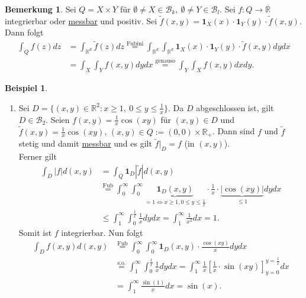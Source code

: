\documentclass[a4paper]{scrreprt}
\newcommand{\doubleOne}{\textbf{1}}
\newcommand{\R}{\mathbb{R}}
\newcommand{\Rq}{\overline{\R}}
\newcommand{\Borel}{\mathcal{B}}
\newcommand{\jlabel}[1]{\label{j_#1}}
\newcommand{\jshortlink}[1]{\jhyperref{#1}{\text{#1}}}
\newcommand{\jhyperref}[2]{\hyperref[j_#1]{#2}}
\newcommand{\jlink}[1]{\jhyperref{#1}{#1}}
\newcommand{\jabb}[3]{ #1: #2 \rightarrow #3 }
\newcommand{\jshortlinkFubini}{\jhyperref{Fubini}{\text{Fub}}}
\theoremstyle{plain}
\theoremstyle{definition}
\newtheorem{bem}[thm]{Bemerkung}
\newtheorem*{expl*}{Beispiel}
\begin{document}
{{{{\begin{bem}
\jlabel{Bem 3.29}
    Sei $Q=X\times Y$ für $\emptyset \ne X \in \Borel_k, \ \emptyset \ne Y \in \Borel_l$. Sei $\jabb{f}{Q}{\Rq}$ integrierbar oder \jlink{messbar} und positiv. Sei $\tilde{f}(x,y) = \doubleOne_X(x)\cdot \doubleOne_Y(y)\cdot \tilde{f}(x,y)$. Dann folgt
    \begin{displaymath}
        \begin{split}
            \int_Q f(z)dz &= \int_{\R^d} \tilde{f}(z)dz \overset{\jshortlink{Fubini}}{=} \int_{\R^d} \int_{\R^d} \doubleOne_X(x)\cdot \doubleOne_Y(y) \cdot \tilde{f}(x,y)dydx\\
            & = \int_X\int_Y f(x,y)dydx \overset{\text{genauso}}{=} \int_Y\int_X f(x,y)dxdy.
        \end{split}
    \end{displaymath}
\end{bem}


\begin{expl*}
    \begin{enumerate}
        \item 
            Sei $D = \{(x,y) \in \R^2 : x \ge 1, \ 0\le y \le \frac{1}{x}\}$. Da $D$ abgeschlossen ist, gilt $D\in \Borel_2$. Seien $f(x,y) = \frac{1}{x}\cos(xy)$ für $(x,y) \in D$ und $\tilde{f}(x,y) = \frac{1}{x}\cos(xy)$, $(x,y)\in Q := (0,0)\times \R_+$. Dann sind $f$ und $\tilde{f}$ stetig und damit \jlink{messbar} und es gilt $\tilde{f}|_D = f$ (in $(x,y)$).\\
            Ferner gilt
            \begin{displaymath}
                \begin{split}
                    \int_D |f|d(x,y) &= \int_Q \doubleOne_D |\tilde{f}|d(x,y)\\
                    &\overset{\jshortlinkFubini}{=} \int_0^\infty \int_0^\infty \underbrace{\doubleOne_D(x,y)}_{= 1 \Leftrightarrow x\ge 1, 0 \le y \le \frac{1}{x}}\cdot \frac{1}{x} \cdot \underbrace{|\cos(xy)|}_{\le 1} dydx\\
                    &\le \int_1^\infty \int_0^{\frac{1}{x}} \frac{1}{x}dydx = \int_1^\infty \frac{1}{x^2} dx = 1.
                \end{split}
            \end{displaymath}
            Somit ist $f$ integrierbar. Nun folgt
            \begin{displaymath}
                \begin{split}
                    \int_D f(x,y) d(x,y) &\overset{\jshortlinkFubini}{=} \int_0^\infty \int_0^\infty \doubleOne_D(x,y) \cdot \frac{\cos(xy)}{x} dydx\\
                    &\overset{\text{s.o.}}{=} \int_1^\infty \int_0^\frac{1}{x} \frac{1}{x}dydx = \int_1^\infty \frac{1}{x} \left[\frac{1}{x} \cdot \sin(xy) \right]_{y=0}^{y=\frac{1}{x}} dx\\
                    &= \int_1^\infty \frac{\sin(1)}{x} dx = \sin(x).
                \end{split}
            \end{displaymath}


\end{enumerate}
\end{expl*}}}}}
\end{document}
